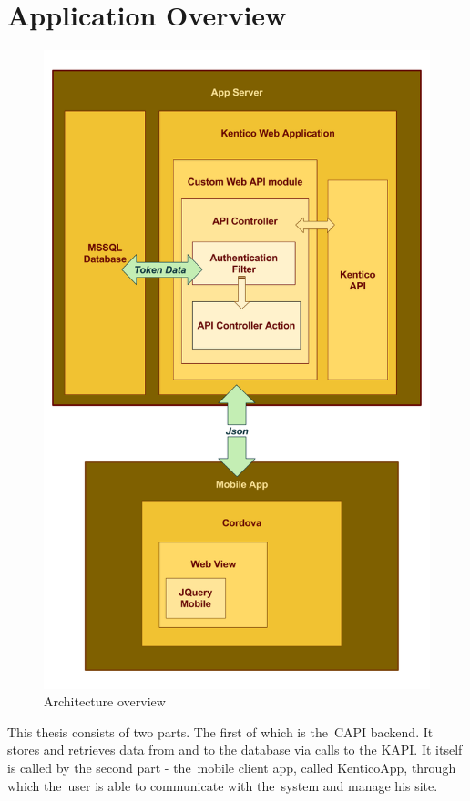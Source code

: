 \section{Application Overview}
\begin{figure}[ht!]
  \centering
  \includegraphics[width=\textwidth]{Images/Architecture.png}
  \caption{Architecture overview}
  \label{architectureOverview}
\end{figure}
This thesis consists of two parts. The first of which is the~CAPI backend. It stores and retrieves data from and to the database via calls to the KAPI. It itself is called by the second part - the~mobile client app, called KenticoApp, through which the~user is able to communicate with the~system and manage his site.

